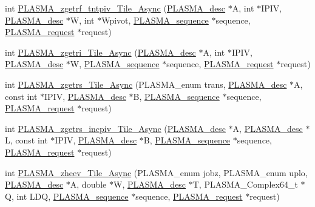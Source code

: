 \begin{DoxyCompactItemize}
\item 
int \hyperlink{group__PLASMA__Complex64__t__Tile__Async_ga42dd20197a45760bcccf94657b581050_ga42dd20197a45760bcccf94657b581050}{P\+L\+A\+S\+M\+A\+\_\+zgetrf\+\_\+tntpiv\+\_\+\+Tile\+\_\+\+Async} (\hyperlink{structplasma__desc__t}{P\+L\+A\+S\+M\+A\+\_\+desc} $\ast$A, int $\ast$I\+P\+I\+V, \hyperlink{structplasma__desc__t}{P\+L\+A\+S\+M\+A\+\_\+desc} $\ast$W, int $\ast$Wpivot, \hyperlink{structplasma__sequence__t}{P\+L\+A\+S\+M\+A\+\_\+sequence} $\ast$sequence, \hyperlink{structplasma__request__t}{P\+L\+A\+S\+M\+A\+\_\+request} $\ast$request)
\item 
int \hyperlink{group__PLASMA__Complex64__t__Tile__Async_ga128683abcbdcfef6eda7503f0ff45d0d_ga128683abcbdcfef6eda7503f0ff45d0d}{P\+L\+A\+S\+M\+A\+\_\+zgetri\+\_\+\+Tile\+\_\+\+Async} (\hyperlink{structplasma__desc__t}{P\+L\+A\+S\+M\+A\+\_\+desc} $\ast$A, int $\ast$I\+P\+I\+V, \hyperlink{structplasma__desc__t}{P\+L\+A\+S\+M\+A\+\_\+desc} $\ast$W, \hyperlink{structplasma__sequence__t}{P\+L\+A\+S\+M\+A\+\_\+sequence} $\ast$sequence, \hyperlink{structplasma__request__t}{P\+L\+A\+S\+M\+A\+\_\+request} $\ast$request)
\item 
int \hyperlink{group__PLASMA__Complex64__t__Tile__Async_gac6868ef9d924faa37a9d6dd42462551c_gac6868ef9d924faa37a9d6dd42462551c}{P\+L\+A\+S\+M\+A\+\_\+zgetrs\+\_\+\+Tile\+\_\+\+Async} (P\+L\+A\+S\+M\+A\+\_\+enum trans, \hyperlink{structplasma__desc__t}{P\+L\+A\+S\+M\+A\+\_\+desc} $\ast$A, const int $\ast$I\+P\+I\+V, \hyperlink{structplasma__desc__t}{P\+L\+A\+S\+M\+A\+\_\+desc} $\ast$B, \hyperlink{structplasma__sequence__t}{P\+L\+A\+S\+M\+A\+\_\+sequence} $\ast$sequence, \hyperlink{structplasma__request__t}{P\+L\+A\+S\+M\+A\+\_\+request} $\ast$request)
\item 
int \hyperlink{group__PLASMA__Complex64__t__Tile__Async_ga3af83e90f2792a198a6766a007d11e31_ga3af83e90f2792a198a6766a007d11e31}{P\+L\+A\+S\+M\+A\+\_\+zgetrs\+\_\+incpiv\+\_\+\+Tile\+\_\+\+Async} (\hyperlink{structplasma__desc__t}{P\+L\+A\+S\+M\+A\+\_\+desc} $\ast$A, \hyperlink{structplasma__desc__t}{P\+L\+A\+S\+M\+A\+\_\+desc} $\ast$L, const int $\ast$I\+P\+I\+V, \hyperlink{structplasma__desc__t}{P\+L\+A\+S\+M\+A\+\_\+desc} $\ast$B, \hyperlink{structplasma__sequence__t}{P\+L\+A\+S\+M\+A\+\_\+sequence} $\ast$sequence, \hyperlink{structplasma__request__t}{P\+L\+A\+S\+M\+A\+\_\+request} $\ast$request)
\item 
int \hyperlink{group__PLASMA__Complex64__t__Tile__Async_ga60a2e9e10307ed2e539bc1ff997465b7_ga60a2e9e10307ed2e539bc1ff997465b7}{P\+L\+A\+S\+M\+A\+\_\+zheev\+\_\+\+Tile\+\_\+\+Async} (P\+L\+A\+S\+M\+A\+\_\+enum jobz, P\+L\+A\+S\+M\+A\+\_\+enum uplo, \hyperlink{structplasma__desc__t}{P\+L\+A\+S\+M\+A\+\_\+desc} $\ast$A, double $\ast$W, \hyperlink{structplasma__desc__t}{P\+L\+A\+S\+M\+A\+\_\+desc} $\ast$T, P\+L\+A\+S\+M\+A\+\_\+\+Complex64\+\_\+t $\ast$Q, int L\+D\+Q, \hyperlink{structplasma__sequence__t}{P\+L\+A\+S\+M\+A\+\_\+sequence} $\ast$sequence, \hyperlink{structplasma__request__t}{P\+L\+A\+S\+M\+A\+\_\+request} $\ast$request)

\end{DoxyCompactItemize}
